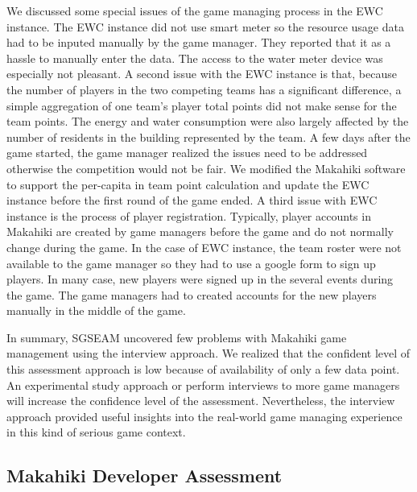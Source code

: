 We discussed some special issues of the game managing process in the EWC instance. The EWC instance did not use smart meter so the resource usage data had to be inputed manually by the game manager. They reported that it as a hassle to manually enter the data. The access to the water meter device was especially not pleasant.  A second issue with the EWC instance is that, because the number of players in the two competing teams has a significant difference, a simple aggregation of one team's player total points did not make sense for the team points. The energy and water consumption were also largely affected by the number of residents in the building represented by the team. A few days after the game started, the game manager realized the issues need to be addressed otherwise the competition would not be fair. We modified the Makahiki software to support the per-capita in team point calculation and update the EWC instance before the first round of the game ended. A third issue with EWC instance is the process of player registration. Typically, player accounts in Makahiki are created by game managers before the game and do not normally change during the game. In the case of EWC instance, the team roster were not available to the game manager so they had to use a google form to sign up players. In many case, new players were signed up in the several events during the game. The game managers had to created accounts for the new players manually in the middle of the game.

In summary, SGSEAM uncovered few problems with Makahiki game management using the interview
approach. We realized that the confident level of this assessment approach is low because of
 availability of only a few data point. An experimental study approach or perform interviews to
more game managers will increase the confidence level of the assessment. Nevertheless, the interview approach provided useful insights into the real-world game managing experience in this kind of serious game context.

\subsection{Makahiki Developer Assessment}

